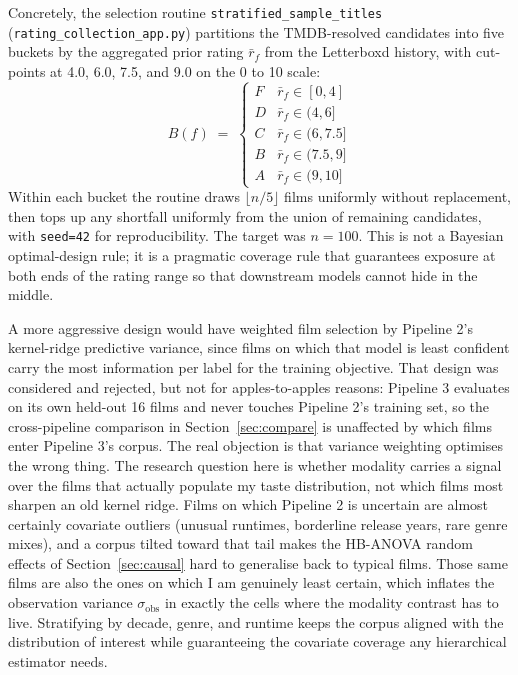 \documentclass{article}
\begin{document}
Concretely, the selection routine \texttt{stratified\_sample\_titles} (\texttt{rating\_collection\_app.py}) partitions the TMDB-resolved candidates into five buckets by the aggregated prior rating $\bar r_f$ from the Letterboxd history, with cut-points at 4.0, 6.0, 7.5, and 9.0 on the 0 to 10 scale:
\begin{equation}
B(f) \;=\; \begin{cases} F & \bar r_f \in [0, 4] \\ D & \bar r_f \in (4, 6] \\ C & \bar r_f \in (6, 7.5] \\ B & \bar r_f \in (7.5, 9] \\ A & \bar r_f \in (9, 10] \end{cases}
\label{eq:rating-buckets}
\end{equation}
Within each bucket the routine draws $\lfloor n / 5 \rfloor$ films uniformly without replacement, then tops up any shortfall uniformly from the union of remaining candidates, with \texttt{seed=42} for reproducibility. The target was $n = 100$. This is not a Bayesian optimal-design rule; it is a pragmatic coverage rule that guarantees exposure at both ends of the rating range so that downstream models cannot hide in the middle.

A more aggressive design would have weighted film selection by Pipeline 2's kernel-ridge predictive variance, since films on which that model is least confident carry the most information per label for the training objective. That design was considered and rejected, but not for apples-to-apples reasons: Pipeline 3 evaluates on its own held-out 16 films and never touches Pipeline 2's training set, so the cross-pipeline comparison in Section~\ref{sec:compare} is unaffected by which films enter Pipeline 3's corpus. The real objection is that variance weighting optimises the wrong thing. The research question here is whether modality carries a signal over the films that actually populate my taste distribution, not which films most sharpen an old kernel ridge. Films on which Pipeline 2 is uncertain are almost certainly covariate outliers (unusual runtimes, borderline release years, rare genre mixes), and a corpus tilted toward that tail makes the HB-ANOVA random effects of Section~\ref{sec:causal} hard to generalise back to typical films. Those same films are also the ones on which I am genuinely least certain, which inflates the observation variance $\sigma_\text{obs}$ in exactly the cells where the modality contrast has to live. Stratifying by decade, genre, and runtime keeps the corpus aligned with the distribution of interest while guaranteeing the covariate coverage any hierarchical estimator needs.
\end{document}
